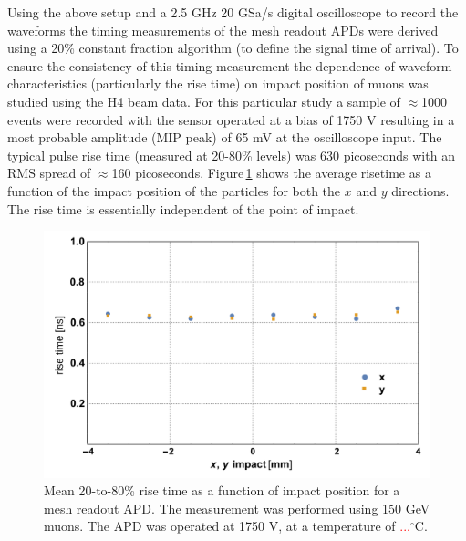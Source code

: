 \documentclass{article}
\begin{document}
Using the above setup and a 2.5 GHz 20 GSa/s digital oscilloscope to record the waveforms the timing measurements of the mesh readout APDs were derived using a 20\% constant fraction algorithm (to define the signal time of arrival).
To ensure the consistency of this timing measurement the dependence of waveform characteristics (particularly the rise time) on impact position of muons was studied using the H4 beam data.
For this particular study a sample of $\approx$1000 events were recorded with the sensor operated at a bias of 1750 V resulting in a most probable amplitude (MIP peak) of 65 mV at the oscilloscope input.
The typical pulse rise time (measured at 20-80\% levels) was 630 picoseconds with an RMS spread of $\approx$160 picoseconds.
Figure\,\ref{fig:risetime8x8impact} shows the average risetime as a function of the impact position of the particles for both the $x$ and $y$ directions.
The rise time is essentially independent of the point of impact.
\begin{figure}
  \centering
  \includegraphics[width = 0.6 \textwidth]{risetime8x8vsImpact}
  \caption{Mean 20-to-80\% rise time as a function of impact position for a mesh readout APD. The measurement was performed using 150 GeV muons. The APD was operated at 1750 V, at a temperature of \textcolor{red}{...}$^\circ$C.}
  \label{fig:risetime8x8impact}
\end{figure}
\end{document}
